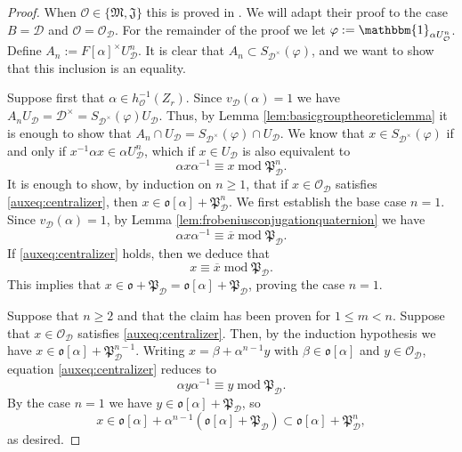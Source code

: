 \documentclass{article}
\theoremstyle{named}
\newcommand{\D}{\mathcal{D}}
\newcommand{\M}{\mathfrak{M}}
\newcommand{\J}{\mathfrak{J}}
\renewcommand{\O}{\mathcal{O}}
\renewcommand{\o}{\mathfrak{o}}
\renewcommand{\P}{\mathfrak{P}}
\DeclareMathOperator{\modulo}{mod}
\begin{document}
\begin{proof}
When $\O \in \{\M, \J\}$ this is proved in \cite[Lemma 16.2]{bushnellhenniart}. We will adapt their proof to the case $B = \D$ and $\O = \O_\D$. For the remainder of the proof we let $\varphi := \mathbbm{1}_{\alpha U_\O^n}$. Define $A_n := F[\alpha]^\times U_\D^n$. It is clear that $A_n \subset S_{\D^\times}(\varphi)$, and we want to show that this inclusion is an equality.  

Suppose first that $\alpha \in h_\O^{-1}(Z_r)$. Since $v_\D(\alpha) = 1$ we have $A_n U_\D = \D^\times= S_{\D^\times}(\varphi) U_\D$. Thus, by Lemma \ref{lem:basicgrouptheoreticlemma} it is enough to show that $A_n \cap U_\D = S_{\D^\times}(\varphi) \cap U_\D$. We know that $x \in S_{\D^\times}(\varphi)$ if and only if $x^{-1}\alpha x \in \alpha U_\D^n$, which if $x \in U_\D$ is also equivalent to 
\begin{equation}\label{auxeq:centralizer}
    \alpha x \alpha^{-1} \equiv x \modulo \P_\D^n.
\end{equation}
It is enough to show, by induction on $n\geq 1$, that if $x \in \O_\D$ satisfies \eqref{auxeq:centralizer}, then $x \in \o[\alpha] + \P_\D^n$. We first establish the base case $n = 1$. Since $v_\D(\alpha) = 1$, by Lemma \ref{lem:frobeniusconjugationquaternion} we have 
\begin{equation*}
    \alpha x \alpha^{-1} \equiv \overline{x} \modulo \P_\D. 
\end{equation*}  
If \eqref{auxeq:centralizer} holds, then we deduce that 
\begin{equation*}
    x \equiv \overline{x} \modulo \P_\D.
\end{equation*}
This implies that $x \in \o + \P_\D = \o[\alpha] + \P_\D$, proving the case $n = 1$.

Suppose that $n \geq 2$ and that the claim has been proven for $1 \leq m < n$. Suppose that $x \in \O_\D$ satisfies \eqref{auxeq:centralizer}. Then, by the induction hypothesis we have $x \in \o[\alpha] + \P_\D^{n-1}$. Writing $x = \beta + \alpha^{n-1} y$ with $\beta \in \o[\alpha]$ and $y \in \O_\D$, equation \eqref{auxeq:centralizer} reduces to 
\begin{equation*}
    \alpha y \alpha^{-1}  \equiv y \modulo \P_\D.
\end{equation*}
By the case $n = 1$ we have $y \in \o[\alpha] + \P_\D$, so 
\begin{equation*}
    x \in \o[\alpha] + \alpha^{n-1}(\o[\alpha] + \P_\D) \subset \o[\alpha] + \P_\D^n,
\end{equation*}
as desired.


\end{proof}
\end{document}
